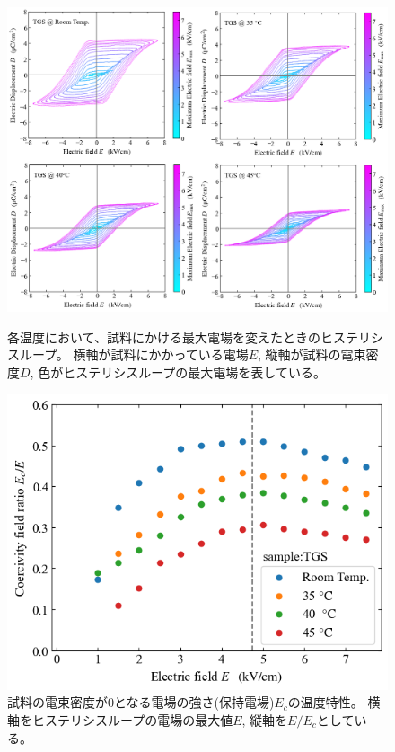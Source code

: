 \documentclass[9pt,dvipdfmx,a4paper]{jsarticle}
\begin{document}
\begin{figure}[H]
    \centering
    \begin{minipage}{0.58\columnwidth}
        \centering
        \includegraphics[width=\columnwidth]{TGS_D-E_temp.png}
        \caption{\small{各温度において、試料にかける最大電場を変えたときのヒステリシスループ。
        横軸が試料にかかっている電場\(E\), 縦軸が試料の電束密度\(D\), 色がヒステリシスループの最大電場を表している。}}
        \label{graph:TGS_D-E_Ec}
    \end{minipage}
    \hfill
    \begin{minipage}{0.4\columnwidth}
        \centering
        \includegraphics[width=\columnwidth]{TGS_Ec-E.png}
        \caption{\small{試料の電束密度が0となる電場の強さ(保持電場)\(E_c\)の温度特性。
        横軸をヒステリシスループの電場の最大値\(E\), 縦軸を\(E/E_c\)としている。}}
        \label{graph:TGS_Ec-E}
    \end{minipage}
\end{figure}
\end{document}
